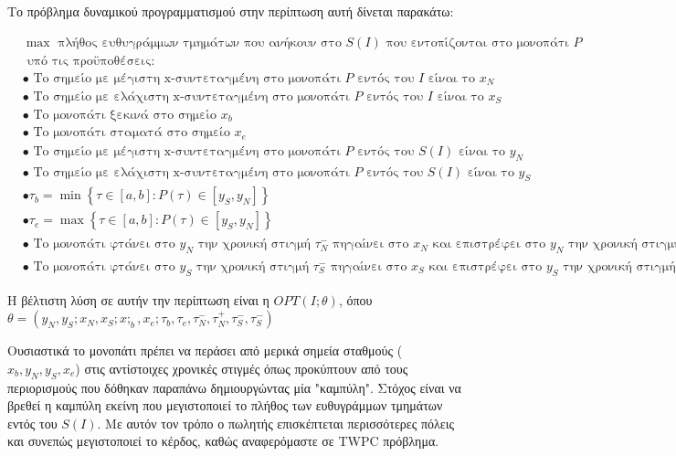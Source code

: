 \documentclass[oneside,12pt]{book}
\theoremstyle{definition}
\begin{document}
Το πρόβλημα δυναμικού προγραμματισμού στην περίπτωση αυτή δίνεται παρακάτω:

\begin{align*}
&\max \text{ πλήθος ευθυγράμμων τμημάτων που ανήκουν στο } S(I) \text{ που εντοπίζονται στο μονοπάτι } P \\
&\text{ υπό τις προϋποθέσεις:} \\
&\bullet \text{ Το σημείο με μέγιστη x-συντεταγμένη στο μονοπάτι } P \text{ εντός του } Ι \text{ είναι το } x_N  \\
&\bullet \text{ Το σημείο με ελάχιστη x-συντεταγμένη στο μονοπάτι } P \text{ εντός του } Ι \text{ είναι το } x_S  \\
&\bullet \text{ Το μονοπάτι ξεκινά στο σημείο } x_b \\
&\bullet \text{ Το μονοπάτι σταματά στο σημείο } x_e \\
&\bullet \text{ Το σημείο με μέγιστη x-συντεταγμένη στο μονοπάτι } P \text{ εντός του } S(I) \text{ είναι το } y_N  \\
&\bullet \text{ Το σημείο με ελάχιστη x-συντεταγμένη στο μονοπάτι } P \text{ εντός του } S(I) \text{ είναι το } y_S  \\
&\bullet τ_b = \min \left\{ τ \in [a,b] : P(τ) \in [y_S, y_N] \right\}  \\
&\bullet τ_e = \max \left\{ τ \in [a,b] : P(τ) \in [y_S, y_N] \right\}  \\
&\bullet \text{ Το μονοπάτι φτάνει στο } y_N \text{ την χρονική στιγμή } τ_{N}^{-} \text{ πηγαίνει στο } x_N \text{ και επιστρέφει στο } y_N \text{ την χρονική στιγμή } τ_{N}^{+} \\
&\bullet \text{ Το μονοπάτι φτάνει στο } y_S \text{ την χρονική στιγμή } τ_{S}^{-} \text{ πηγαίνει στο } x_S \text{ και επιστρέφει στο } y_S \text{ την χρονική στιγμή } τ_{S}^{+}
\end{align*}

Η βέλτιστη λύση σε αυτήν την περίπτωση είναι η \(OPT(I;θ)\), όπου \\ \(θ = (y_N, y_S; x_N, x_S; x;_b, x_e; τ_b, τ_e, τ_{N}^{-} ,τ_{N}^{+}, τ_{S}^{-}, τ_{S}^{-})\)

Ουσιαστικά το μονοπάτι πρέπει να περάσει από μερικά σημεία σταθμούς (\(x_b, y_N, y_S, x_e\)) στις αντίστοιχες χρονικές στιγμές όπως προκύπτουν από τους περιορισμούς που δόθηκαν παραπάνω δημιουργώντας μία "καμπύλη". Στόχος είναι να βρεθεί η καμπύλη εκείνη που μεγιστοποιεί το πλήθος των ευθυγράμμων τμημάτων εντός του \(S(I)\). Με αυτόν τον τρόπο ο πωλητής επισκέπτεται περισσότερες πόλεις και συνεπώς μεγιστοποιεί το κέρδος, καθώς αναφερόμαστε σε TWPC πρόβλημα. \\
\end{document}
